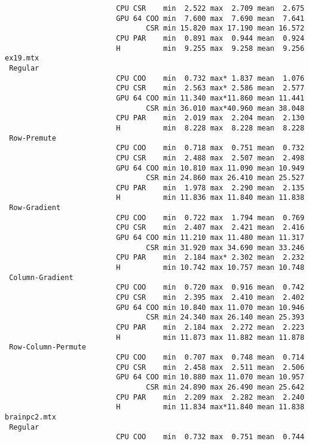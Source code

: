 \begin{verbatim}
                          CPU CSR    min  2.522 max  2.709 mean  2.675
                          GPU 64 COO min  7.600 max  7.690 mean  7.641
                                 CSR min 15.820 max 17.190 mean 16.572
                          CPU PAR    min  0.891 max  0.944 mean  0.924
                          H          min  9.255 max  9.258 mean  9.256
ex19.mtx
 Regular
                          CPU COO    min  0.732 max* 1.837 mean  1.076
                          CPU CSR    min  2.563 max* 2.586 mean  2.577
                          GPU 64 COO min 11.340 max*11.860 mean 11.441
                                 CSR min 36.010 max*40.960 mean 38.048
                          CPU PAR    min  2.019 max  2.204 mean  2.130
                          H          min  8.228 max  8.228 mean  8.228
 Row-Premute
                          CPU COO    min  0.718 max  0.751 mean  0.732
                          CPU CSR    min  2.488 max  2.507 mean  2.498
                          GPU 64 COO min 10.810 max 11.090 mean 10.949
                                 CSR min 24.860 max 26.410 mean 25.527
                          CPU PAR    min  1.978 max  2.290 mean  2.135
                          H          min 11.836 max 11.840 mean 11.838
 Row-Gradient
                          CPU COO    min  0.722 max  1.794 mean  0.769
                          CPU CSR    min  2.407 max  2.421 mean  2.416
                          GPU 64 COO min 11.210 max 11.480 mean 11.317
                                 CSR min 31.920 max 34.690 mean 33.246
                          CPU PAR    min  2.184 max* 2.302 mean  2.232
                          H          min 10.742 max 10.757 mean 10.748
 Column-Gradient
                          CPU COO    min  0.720 max  0.916 mean  0.742
                          CPU CSR    min  2.395 max  2.410 mean  2.402
                          GPU 64 COO min 10.840 max 11.070 mean 10.946
                                 CSR min 24.340 max 26.140 mean 25.393
                          CPU PAR    min  2.184 max  2.272 mean  2.223
                          H          min 11.873 max 11.882 mean 11.878
 Row-Column-Permute
                          CPU COO    min  0.707 max  0.748 mean  0.714
                          CPU CSR    min  2.458 max  2.511 mean  2.506
                          GPU 64 COO min 10.880 max 11.070 mean 10.957
                                 CSR min 24.890 max 26.490 mean 25.642
                          CPU PAR    min  2.209 max  2.282 mean  2.240
                          H          min 11.834 max*11.840 mean 11.838
brainpc2.mtx
 Regular
                          CPU COO    min  0.732 max  0.751 mean  0.744

\end{verbatim}
